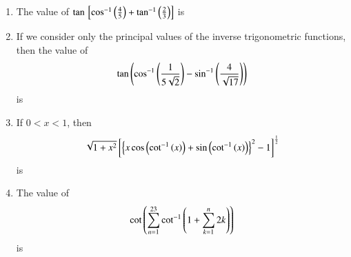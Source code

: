 \begin{enumerate}[label=\thesubsection.\arabic*,ref=\thesubsection.\theenumi]
\item The value of $\tan {}\left[ \cos ^{-1}\left(\frac{4}{5}\right)+\tan^{-1}\left(\frac{2}{3}\right) \right]$ is
\hfill {}
\begin{enumerate}
\end{enumerate}
\item If we consider only the principal values of the inverse trigonometric functions, then the value of
\begin{align*}
\tan \left(\cos ^{-1}\left(\frac{1}{5\sqrt{2}}\right)-\sin ^{-1}\left(\frac{4}{\sqrt{17}}\right)\right)
\end{align*}
is
\hfill {}
\begin{enumerate}
\end{enumerate}
\item  If $0<x<1$, then 
\begin{multline*}
\sqrt{1+x^2}{}\left[\left\{ x\cos \left(\cot ^{-1}\left(x\right)\right)+ \sin \left(\cot ^{-1}\left(x\right)\right)\right\}^2 - 1\right]^{\frac{1}{2}}
\end{multline*}
is
\hfill {}
\begin{enumerate}
\end{enumerate}
\item The value of 
\begin{align*}
\cot \left(\sum_{n=1}^{23} \cot ^{-1}\left(1+\sum_{k=1}^{n} 2k\right)\right)
\end{align*}
is
\hfill {}
\begin{enumerate}
\begin{multicols}{4}

\end{multicols}
\end{enumerate}
\end{enumerate}
